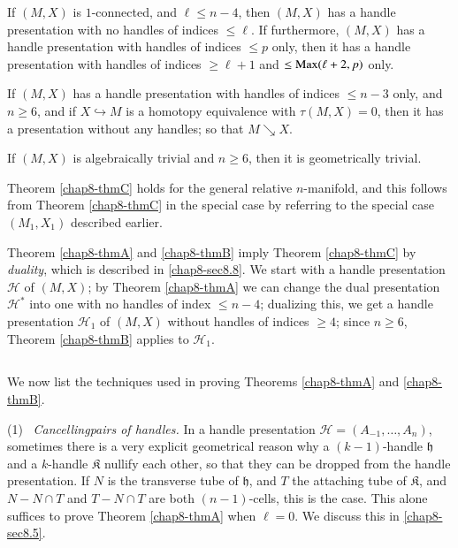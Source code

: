 \begin{alphtheorem}\label{chap8-thmA}
If $(M,X)$ is $1$-connected, and $\ell\leq n-4$, then $(M,X)$ has a handle presentation with no handles of indices $\leq \ell$. If furthermore, $(M,X)$ has a handle presentation with handles of indices $\leq p$ only, then it has a handle presentation with handles of indices $\geq \ell+1$ and $\leq \operatorname{Max} (\ell+2,p)$ only. 
\end{alphtheorem}

\begin{alphtheorem}\label{chap8-thmB}
If $(M,X)$ has a handle presentation with handles of indices $\leq n-3$ only, and $n\geq 6$, and if $X\hookrightarrow M$ is a homotopy equivalence with $\tau(M,X)=0$, then it has a presentation without any handles; so that $M\searrow X$.
\end{alphtheorem}

\begin{alphtheorem}\label{chap8-thmC}
If $(M,X)$ is algebraically trivial and $n\geq 6$, then it is geometrically trivial.
\end{alphtheorem}

Theorem \ref{chap8-thmC} holds for the general relative $n$-manifold, and this follows from Theorem \ref{chap8-thmC} in the special case by referring to the special case $(M_{1},X_{1})$ described earlier.

Theorem \ref{chap8-thmA} and \ref{chap8-thmB} imply Theorem \ref{chap8-thmC} by {\em duality}, which is described in \ref{chap8-sec8.8}. We start with a handle presentation $\mathscr{H}$ of $(M,X)$; by Theorem \ref{chap8-thmA} we can change the dual presentation $\mathscr{H}^{*}$ into one with no handles of index $\leq n-4$; dualizing this, we get a handle presentation $\mathscr{H}_{1}$ of $(M,X)$ without handles of indices $\geq 4$; since $n\geq 6$, Theorem \ref{chap8-thmB} applies to $\mathscr{H}_{1}$.

\setcounter{subsection}{2}
\subsection{}\label{chap8-sec8.3.3}
We now list the techniques used in proving Theorems \ref{chap8-thmA} and \ref{chap8-thmB}.

\medskip
(1)~ {\em Cancelling\pageoriginale pairs of handles.} In a handle presentation $\mathscr{H}=(A_{-1},\ldots,A_{n})$, sometimes there is a very explicit geometrical reason why a $(k-1)$-handle $\mathfrak{h}$ and a $k$-handle $\mathfrak{K}$ nullify each other, so that they can be dropped from the handle presentation. If $N$ is the transverse tube of $\mathfrak{h}$, and $T$ the attaching tube of $\mathfrak{K}$, and $N-N\cap T$ and $T-N\cap T$ are both $(n-1)$-cells, this is the case. This alone suffices to prove Theorem \ref{chap8-thmA} when $\ell=0$. We discuss this in \ref{chap8-sec8.5}.

